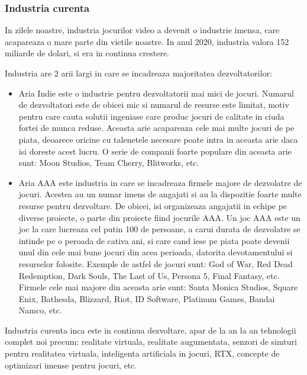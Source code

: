 \documentclass[12pt, a4paper]{article}
\begin{document}
	
	
	
	
	\subsubsection{Industria curenta}
	
	In zilele noastre, industria jocurilor video a devenit o industrie imensa, care acapareaza o mare parte din vietile noastre. In anul 2020, industria valora 152 miliarde de dolari, si era in continua crestere.
	\newline
	
	Industria are 2 arii largi in care se incadreaza majoritatea dezvoltatorilor:
	
	\begin{itemize}
		\item Aria Indie este o industrie pentru dezvoltatorii mai mici de jocuri. Numarul de dezvoltatori este de obicei mic si numarul de resurse este limitat, motiv pentru care cauta solutii ingeniase care produc jocuri de calitate in ciuda fortei de munca reduse. Aceasta arie acapareaza cele mai multe jocuri de pe piata, deoarece oricine cu talenetele necesare poate intra in aceasta arie daca isi doreste acest lucru. O serie de companii foarte populare din aceasta arie sunt: Moon Studios, Team Cherry, Blitworks, etc.
		\item Aria AAA este industria in care se incadreaza firmele majore de dezvolatre de jocuri. Acestea au un numar imens de angajati si au la dispozitie foarte multe resurse pentru dezvoltare. De obicei, isi organizeaza angajatii in echipe pe diverse proiecte, o parte din proiecte fiind jocurile AAA. Un joc AAA este un joc la care lucreaza cel putin 100 de persoane, a carui durata de dezvolatre se intinde pe o peroada de cativa ani, si care cand iese pe piata poate devenii unul din cele mai bune jocuri din acea perioada, datorita devotamentului si resurselor folosite. Exemple de astfel de jocuri sunt: God of War, Red Dead Redemption, Dark Souls, The Last of Us, Persona 5, Final Fantasy, etc. Firmele cele mai majore din aceasta arie sunt: Santa Monica Studios, Square Enix, Bathesda, Blizzard, Riot, ID Software, Platinum Games, Bandai Namco, etc.
	\end{itemize}
	
	Industria curenta inca este in continua dezvoltare, apar de la an la an tehnologii complet noi precum: realitate virtuala, realitate augumentata, senzori de simturi pentru realitatea virtuala, inteligenta artificiala in jocuri, RTX, concepte de optimizari imense pentru jocuri, etc.
	
\end{document}
